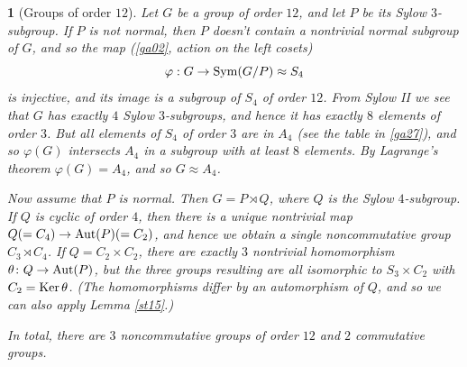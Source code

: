 \documentclass[a4paper,11pt,final]{memoir}%
\newtheorem{plain}[X]{}
\theoremstyle{nonumberplain}
\begin{document}
\begin{plain}
[Groups of order $12$]\label{st18}%
%
Let $G$ be a group of order $12$, and let $P$ be its Sylow $3$-subgroup. If
$P$ is not normal, then $P$ doesn't contain a nontrivial normal subgroup of
$G$, and so the map (\ref{ga02}, action on the left cosets)
\[
\varphi:G\rightarrow\Sym(G/P)\approx S_{4}%
\]
is injective, and its image is a subgroup of $S_{4}$ of order $12$. From Sylow
II we see that $G$ has exactly $4$ Sylow $3$-subgroups, and hence it has
exactly $8$ elements of order $3$. But all elements of $S_{4}$ of order $3$
are in $A_{4}$ (see the table in \ref{ga27}), and so $\varphi(G)$ intersects
$A_{4}$ in a subgroup with at least $8$ elements. By Lagrange's theorem
$\varphi(G)=A_{4}$, and so $G\approx A_{4}$.

Now assume that $P$ is normal. Then $G=P\rtimes Q$, where $Q$ is the Sylow
$4$-subgroup. If $Q$ is cyclic of order $4$, then there is a unique nontrivial
map $Q(=C_{4})\rightarrow\operatorname{Aut}(P)(=C_{2})$, and hence we obtain a single
noncommutative group $C_{3}\rtimes C_{4}$. If $Q=C_{2}\times C_{2}$, there are
exactly $3$ nontrivial homomorphism $\theta\colon Q\rightarrow\operatorname{Aut}(P)$, but
the three groups resulting are all isomorphic to $S_{3}\times C_{2}$ with
$C_{2}=\operatorname{Ker}\theta$. (The homomorphisms differ by an automorphism of $Q$, and
so we can also apply Lemma \ref{st15}.)

In total, there are $3$ noncommutative groups of order $12$ and $2$
commutative groups.
\end{plain}
\end{document}
